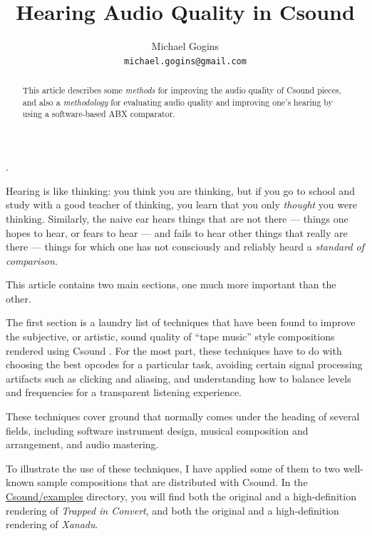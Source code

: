 \documentclass[english,11pt,letterpaper,onecolumn]{scrartcl}
\begin{document}
.
\title{Hearing Audio Quality in Csound}
\date{}
\author{Michael Gogins \\ \texttt{michael.gogins@gmail.com}}
\maketitle
\begin{abstract}
This article describes some \emph{methods} for improving the audio quality of Csound pieces, and also a \emph{methodology} for evaluating audio quality and improving one's hearing by using a software-based ABX comparator.
\end{abstract}

Hearing is like thinking: you think you are thinking, but if you go to school 
and study with a good teacher of thinking, you learn that you only 
\emph{thought} you were thinking. Similarly, the naive ear hears things that 
are not there --- things one hopes to hear, or fears to hear --- and fails to 
hear other things that really are there --- things for which one has not 
consciously and reliably heard a \emph{standard of comparison}.

This article contains two main sections, one much more important than the 
other. 

The first section is a laundry list of techniques that have been found to 
improve the subjective, or artistic, sound quality of ``tape music'' style 
compositions rendered using Csound \cite{csoundhome}. For the most part, 
these techniques have to do with choosing the best opcodes for a particular 
task, avoiding certain signal processing artifacts such as clicking and 
aliasing, and understanding how to balance levels and frequencies for a 
transparent listening experience. 

These techniques cover ground that normally comes under the heading of several 
fields, including software instrument design, musical composition and 
arrangement, and audio mastering.

To illustrate the use of these techniques, I have applied some of them to two 
well-known sample compositions that are distributed with Csound. In the 
\url{Csound/examples} directory, you will find both the original and a 
high-definition rendering of \emph{Trapped in Convert}, and both the original 
and a high-definition rendering of \emph{Xanadu}.
\end{document}
